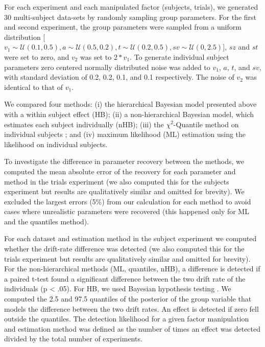 \documentclass[letterpaper,10pt,english]{article}
\begin{document}
For each experiment and each manipulated factor (subjects, trials), we generated 30 multi-subject data-sets by randomly sampling group parameters. For the first and second experiment, the group parameters were sampled from a uniform distribution [$v_{\text{1}} \sim \mathcal{U}(0.1, 0.5), a \sim \mathcal{U}(0.5, 0.2), t \sim \mathcal{U}(0.2, 0.5), sv \sim \mathcal{U}(0, 2.5)$], $sz$ and $st$ were set to zero, and $v_{\text{2}}$ was set to $2*v_{\text{1}}$. To generate individual subject parameters zero centered normally distributed noise was added to $v_{\text{1}}$, $a$, $t$, and $sv$, with standard deviation of 0.2, 0.2, 0.1, and 0.1 respectively. The noise of $v_{\text{2}}$ was identical to that of $v_{\text{1}}$.

We compared four methods: (i) the hierarchical Bayesian model
presented above with a within subject effect (HB); (ii) a
non-hierarchical Bayesian model, which estimates each subject
individually (nHB); (iii) the $\chi^2$-Quantile method on individual
subjects \citep{RatcliffTuerlinckx02}; and (iv) maximum likelihood
(ML) estimation using the \citet{NavarroFuss09} likelihood on
individual subjects.

To investigate the difference in parameter recovery between the methods, we computed the mean absolute error of the recovery for each parameter and method in the trials experiment (we also computed this for the subjects experiment but results are qualitatively similar and omitted for brevity). We excluded the largest errors (5\%) from our calculation for each method to avoid cases where unrealistic parameters were recovered (this happened only for ML and the quantiles method).

For each dataset and estimation method in the subject experiment we computed whether the drift-rate difference was detected (we also computed this for the trials experiment but results are qualitatively similar and omitted for brevity). For the non-hierarchical methods (ML, quantiles, nHB), a difference is detected if a paired t-test found a significant difference between the two drift rate of the individuals (p < .05).  For HB, we used Bayesian hypothesis testing \citep{Lindley65,Kruschke10}. We computed the 2.5 and 97.5 quantiles of the posterior of the group variable that models the difference between the two drift rates. An effect is detected if zero fell outside the quantiles. The detection likelihood for a given factor manipulation and estimation method was defined as the number of times an effect was detected divided by the total number of experiments.
\end{document}
